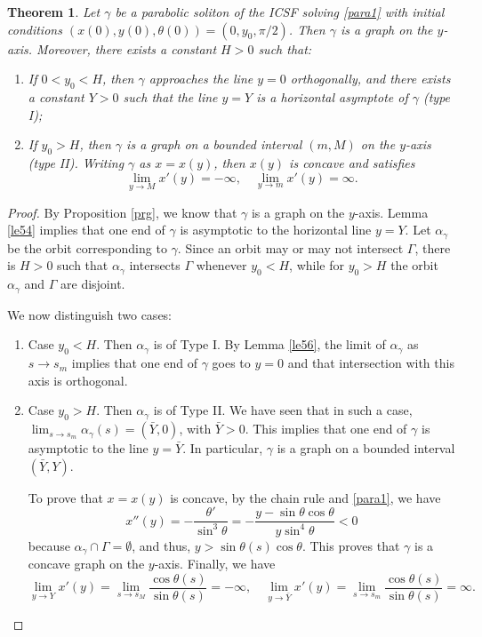 \documentclass[12pt]{amsart}
\theoremstyle{plain}
\newtheorem{theorem}{Theorem}[section]
\theoremstyle{definition}
\begin{document}
\begin{theorem}\label{t55}
Let $\gamma$ be a parabolic soliton of the ICSF solving \eqref{para1} with initial conditions $(x(0),y(0),\theta(0))=(0,y_0,\pi/2)$. Then $\gamma$ is a graph on the $y$-axis. Moreover, there exists a constant $H > 0$ such that:
\begin{enumerate}
\item  If $0<y_0<H$, then $\gamma$ approaches the line $y=0$ orthogonally, and there exists a constant $Y > 0$ such that the line $y = Y$ is a horizontal asymptote of $\gamma$ (type I);
\item If $y_0>H$, then $\gamma$ is a graph on a bounded interval $(m, M)$ on the $y$-axis (type II). Writing $\gamma$ as $x=x(y)$, then   $x(y)$ is concave and satisfies 
$$\lim_{y\to M}x'(y)=-\infty,\quad \lim_{y\to m}x'(y)=\infty.$$
\end{enumerate}
\end{theorem}

\begin{proof}
By Proposition \ref{prg}, we know that $\gamma$ is a graph on the $y$-axis. Lemma \ref{le54} implies that one end of $\gamma$ is asymptotic to the horizontal line $y=Y$.
Let $\alpha_\gamma$ be the  orbit  corresponding to $\gamma$. Since an orbit may or may not intersect $\Gamma$, there is $H> 0$ such that $\alpha_\gamma$ intersects $\Gamma$ whenever $y_0 < H$, while for $y_0 > H$  the orbit  $\alpha_\gamma$ and $\Gamma$ are disjoint. 

We now distinguish two cases:
\begin{enumerate}
\item Case   $y_0 < H$. Then  $\alpha_\gamma$ is of Type I. By Lemma \ref{le56}, the limit of $\alpha_\gamma$ as $s\to s_m$ implies that one end of $\gamma$ goes to $y=0$ and that intersection with this axis is orthogonal. 



\item Case $y_0>H$. Then $\alpha_\gamma$ is of Type II. We have seen that in such a case,  $\lim_{s \to s_m} \alpha_\gamma(s) = (\bar{Y},0)$, with $\bar{Y}>0$. This implies that one end of $\gamma$ is asymptotic to the line $y=\bar{Y}$. In particular, $\gamma$ is a graph on a  bounded interval $(\bar{Y},Y)$. 

 
To prove that $x=x(y)$ is concave, by the chain rule and \eqref{para1}, we have 
$$x''(y)=-\frac{\theta'}{\sin^3\theta}=-\frac{y-\sin\theta\cos\theta}{y\sin^4\theta}<0$$
because $\alpha_\gamma\cap\Gamma=\emptyset$, and thus, $y>\sin\theta(s)\cos\theta$. This proves that $\gamma$ is a concave graph on the $y$-axis.  Finally, we have 
$$\lim_{y \to Y} x'(y) =\lim_{s\to s_M}\frac{\cos\theta(s)}{\sin\theta(s)}=-\infty,\quad \lim_{y \to \bar{Y}} x'(y) =\lim_{s\to s_m}\frac{\cos\theta(s)}{\sin\theta(s)}=\infty .$$
\end{enumerate}
\end{proof}
\end{document}
